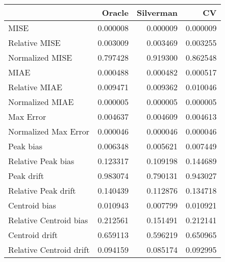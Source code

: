 \begin{tabular}{lrrr}
  \hline
 & Oracle & Silverman & CV \\ 
  \hline
MISE & 0.000008 & 0.000009 & 0.000009 \\ 
  Relative MISE & 0.003009 & 0.003469 & 0.003255 \\ 
  Normalized MISE & 0.797428 & 0.919300 & 0.862548 \\ 
  MIAE & 0.000488 & 0.000482 & 0.000517 \\ 
  Relative MIAE & 0.009471 & 0.009362 & 0.010046 \\ 
  Normalized MIAE & 0.000005 & 0.000005 & 0.000005 \\ 
  Max Error & 0.004637 & 0.004609 & 0.004613 \\ 
  Normalized Max Error & 0.000046 & 0.000046 & 0.000046 \\ 
  Peak bias & 0.006348 & 0.005621 & 0.007449 \\ 
  Relative Peak bias & 0.123317 & 0.109198 & 0.144689 \\ 
  Peak drift & 0.983074 & 0.790131 & 0.943027 \\ 
  Relative Peak drift & 0.140439 & 0.112876 & 0.134718 \\ 
  Centroid bias & 0.010943 & 0.007799 & 0.010921 \\ 
  Relative Centroid bias & 0.212561 & 0.151491 & 0.212141 \\ 
  Centroid drift & 0.659113 & 0.596219 & 0.650965 \\ 
  Relative Centroid drift & 0.094159 & 0.085174 & 0.092995 \\ 
   \hline
\end{tabular}
